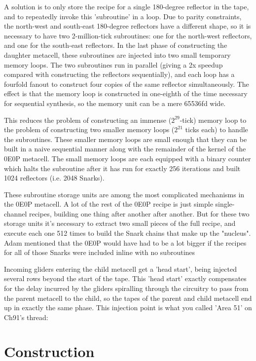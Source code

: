 A solution is to only store the recipe for a single 180-degree reflector in the tape, and to repeatedly invoke this 'subroutine' in a loop. Due to parity constraints, the north-west and south-east 180-degree reflectors have a different shape, so it is necessary to have two 2-million-tick subroutines: one for the north-west reflectors, and one for the south-east reflectors. In the last phase of constructing the daughter metacell, these subroutines are injected into two small temporary memory loops. The two subroutines run in parallel (giving a 2x speedup compared with constructing the reflectors sequentially), and each loop has a fourfold fanout to construct four copies of the same reflector simultaneously. The effect is that the memory loop is constructed in one-eighth of the time necessary for sequential synthesis, so the memory unit can be a mere 65536fd wide.

This reduces the problem of constructing an immense ($2^{29}$-tick) memory loop to the problem of constructing two smaller memory loops ($2^{21}$ ticks each) to handle the subroutines. These smaller memory loops are small enough that they can be built in a naive sequential manner along with the remainder of the kernel of the 0E0P metacell. The small memory loops are each equipped with a binary counter which halts the subroutine after it has run for exactly 256 iterations and built 1024 reflectors (i.e. 2048 Snarks).

These subroutine storage units are among the most complicated mechanisms in the 0E0P metacell. A lot of the rest of the 0E0P recipe is just simple single-channel recipes, building one thing after another after another. But for these two storage units it's necessary to extract two small pieces of the full recipe, and execute each one 512 times to build the Snark chains that make up the "nucleus". Adam mentioned that the 0E0P would have had to be a lot bigger if the recipes for all of those Snarks were included inline with no subroutines

Incoming gliders entering the child metacell get a 'head start', being injected several rows beyond the start of the tape. This 'head start' exactly compensates for the delay incurred by the gliders spiralling through the circuitry to pass from the parent metacell to the child, so the tapes of the parent and child metacell end up in exactly the same phase. This injection point is what you called 'Area 51' on Ch91's thread:


\section{Construction}\label{sec:0e0p_construction}

